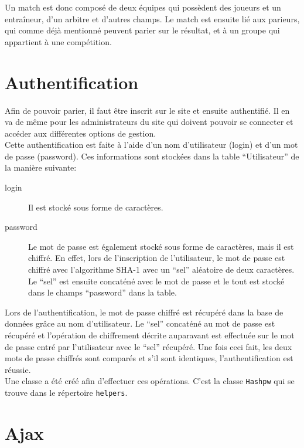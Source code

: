 \documentclass[10pt,a4paper,titlepage]{article}
\begin{document}
Un match est donc composé de deux équipes qui possèdent des joueurs et un entraîneur, d'un arbitre et d'autres champs. Le match est ensuite lié aux parieurs, qui comme déjà mentionné peuvent parier sur le résultat, et à un groupe qui appartient à une compétition.

\section{Authentification}
Afin de pouvoir parier, il faut être inscrit sur le site et ensuite authentifié. Il en va de même pour les administrateurs du site qui doivent pouvoir se connecter et accéder aux différentes options de gestion.\\

Cette authentification est faite à l'aide d'un nom d'utilisateur (login) et d'un mot de passe (password). Ces informations sont stockées dans la table “Utilisateur” de la manière suivante:
\begin{description}
	\item [login] {Il est stocké sous forme de caractères.}
	\item [password] {Le mot de passe est également stocké sous forme de caractères, mais il est chiffré. En effet, lors de l'inscription de l'utilisateur, le mot de passe est chiffré avec l'algorithme SHA-1 avec un “sel” aléatoire de deux caractères. Le “sel” est ensuite concaténé avec le mot de passe et le tout est stocké dans le champs “password” dans la table.\\}
\end{description}

Lors de l'authentification, le mot de passe chiffré est récupéré dans la base de données grâce au nom d'utilisateur. Le “sel” concaténé au mot de passe est récupéré et l'opération de chiffrement décrite auparavant est effectuée sur le mot de passe entré par l'utilisateur avec le “sel” récupéré. Une fois ceci fait, les deux mots de passe chiffrés sont comparés et s'il sont identiques, l'authentification est réussie.\\

Une classe a été créé afin d'effectuer ces opérations. C'est la classe \verb!Hashpw! qui se trouve dans le répertoire \verb!helpers!.

\section{Ajax}
\end{document}
